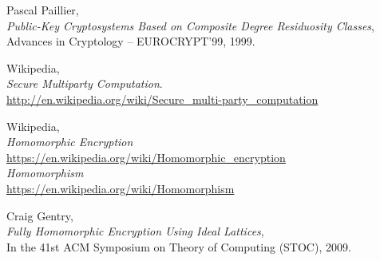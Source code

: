 \newpage
\begin{thebibliography}{99999}

 
   Pascal Paillier, \\
   {\em Public-Key Cryptosystems Based on Composite Degree Residuosity Classes},\\
	 Advances in Cryptology -- EUROCRYPT'99, 1999.

 
   Wikipedia, \\
   {\em Secure Multiparty Computation}.\\
   \url{http://en.wikipedia.org/wiki/Secure_multi-party_computation}

   Wikipedia, \\
   {\em Homomorphic Encryption}\\
   \url{https://en.wikipedia.org/wiki/Homomorphic_encryption}\\
   {\em Homomorphism}\\
   \url{https://en.wikipedia.org/wiki/Homomorphism}

 
   Craig Gentry, \\
   {\em Fully Homomorphic Encryption Using Ideal Lattices},\\
	In the 41st ACM Symposium on Theory of Computing (STOC), 2009.

\end{thebibliography}  %



